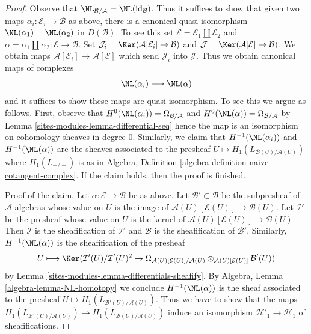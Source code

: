 \begin{proof}
Observe that $\NL_{\mathcal{B}/\mathcal{A}} = \NL(\text{id}_\mathcal{B})$.
Thus it suffices to show that given two maps
$\alpha_i : \mathcal{E}_i \to \mathcal{B}$ as above, there is a
canonical quasi-isomorphism $\NL(\alpha_1) = \NL(\alpha_2)$ in $D(\mathcal{B})$.
To see this set $\mathcal{E} = \mathcal{E}_1 \amalg \mathcal{E}_2$ and
$\alpha = \alpha_1 \amalg \alpha_2 : \mathcal{E} \to \mathcal{B}$.
Set
$\mathcal{J}_i = \Ker(\mathcal{A}[\mathcal{E}_i] \to \mathcal{B})$
and
$\mathcal{J} = \Ker(\mathcal{A}[\mathcal{E}] \to \mathcal{B})$.
We obtain maps $\mathcal{A}[\mathcal{E}_i] \to \mathcal{A}[\mathcal{E}]$
which send $\mathcal{J}_i$ into $\mathcal{J}$.
Thus we obtain canonical maps of complexes
$$
\NL(\alpha_i) \longrightarrow \NL(\alpha)
$$
and it suffices to show these maps are quasi-isomorphism. To see this
we argue as follows. First, observe that
$H^0(\NL(\alpha_i)) = \Omega_{\mathcal{B}/\mathcal{A}}$ and
$H^0(\NL(\alpha)) = \Omega_{\mathcal{B}/\mathcal{A}}$ by
Lemma \ref{sites-modules-lemma-differential-seq}
hence the map is an isomorphism on cohomology sheaves in degree $0$.
Similarly, we claim that $H^{-1}(\NL(\alpha_i))$ and $H^{-1}(\NL(\alpha))$
are the sheaves associated to the presheaf
$U \mapsto H_1(L_{\mathcal{B}(U)/\mathcal{A}(U)})$ where
$H_1(L_{-/-})$ is as in
Algebra, Definition \ref{algebra-definition-naive-cotangent-complex}.
If the claim holds, then the proof is finished.

\medskip\noindent
Proof of the claim. Let $\alpha : \mathcal{E} \to \mathcal{B}$
be as above. Let $\mathcal{B}' \subset \mathcal{B}$ be the subpresheaf
of $\mathcal{A}$-algebras whose value on $U$ is the image of
$\mathcal{A}(U)[\mathcal{E}(U)] \to \mathcal{B}(U)$. Let $\mathcal{I}'$
be the presheaf whose value on $U$ is the kernel of
$\mathcal{A}(U)[\mathcal{E}(U)] \to \mathcal{B}(U)$. Then $\mathcal{I}$
is the sheafification of $\mathcal{I}'$ and $\mathcal{B}$ is
the sheafification of $\mathcal{B}'$. Similarly,
$H^{-1}(\NL(\alpha))$ is the sheafification of the presheaf
$$
U \longmapsto
\Ker(\mathcal{I}'(U)/\mathcal{I}'(U)^2 \to
\Omega_{\mathcal{A}(U)[\mathcal{E}(U)]/\mathcal{A}(U)}
\otimes_{\mathcal{A}(U)[\mathcal{E}(U)]} \mathcal{B}'(U))
$$
by Lemma \ref{sites-modules-lemma-differentials-sheafify}.
By Algebra, Lemma \ref{algebra-lemma-NL-homotopy} we conclude
$H^{-1}(\NL(\alpha))$ is the sheaf associated to the presheaf
$U \mapsto H_1(L_{\mathcal{B}'(U)/\mathcal{A}(U)})$. Thus we have
to show that the maps
$H_1(L_{\mathcal{B}'(U)/\mathcal{A}(U)}) \to
H_1(L_{\mathcal{B}(U)/\mathcal{A}(U)})$ induce an isomorphism
$\mathcal{H}'_1 \to \mathcal{H}_1$ of sheafifications.


\end{proof}
